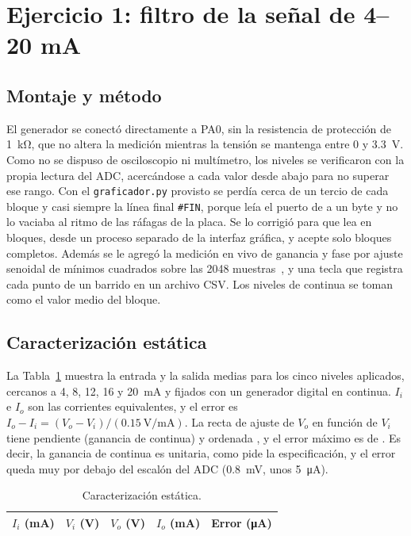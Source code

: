 \section{Ejercicio 1: filtro de la señal de 4--20 mA}

\subsection{Montaje y método}
El generador se conectó directamente a PA0, sin la resistencia de protección de \SI{1}{\kilo\ohm}, que no altera la medición mientras la tensión se mantenga entre 0 y \SI{3,3}{\volt}. Como no se dispuso de osciloscopio ni multímetro, los niveles se verificaron con la propia lectura del ADC, acercándose a cada valor desde abajo para no superar ese rango. Con el \texttt{graficador.py} provisto se perdía cerca de un tercio de cada bloque y casi siempre la línea final \texttt{\#FIN}, porque leía el puerto de a un byte y no lo vaciaba al ritmo de las ráfagas de la placa. Se lo corrigió para que lea en bloques, desde un proceso separado de la interfaz gráfica, y acepte solo bloques completos. Además se le agregó la medición en vivo de ganancia y fase por ajuste senoidal de mínimos cuadrados sobre las 2048 muestras~\cite{ieee1057}, y una tecla que registra cada punto de un barrido en un archivo CSV. Los niveles de continua se toman como el valor medio del bloque.

\subsection{Caracterización estática}
La Tabla~\ref{tab:estatica} muestra la entrada y la salida medias para los cinco niveles aplicados, cercanos a 4, 8, 12, 16 y \SI{20}{\milli\ampere} y fijados con un generador digital en continua. $I_i$ e $I_o$ son las corrientes equivalentes, y el error es $I_o - I_i = (V_o - V_i)/(\SI{0,15}{\volt\per\milli\ampere})$. La recta de ajuste de $V_o$ en función de $V_i$ tiene pendiente (ganancia de continua) \nm{\resGanDC} y ordenada \val{\resOrdDC}{\milli\volt}, y el error máximo es de \val{\resErrMax}{\micro\ampere}. Es decir, la ganancia de continua es unitaria, como pide la especificación, y el error queda muy por debajo del escalón del ADC (\SI{0,8}{\milli\volt}, unos \SI{5}{\micro\ampere}).

\begin{table}[!htb]
\centering
\caption{Caracterización estática.}
\label{tab:estatica}
\begin{tabular}{ccccc}
\toprule
$I_i$ (mA) & $V_i$ (V) & $V_o$ (V) & $I_o$ (mA) & Error (\si{\micro\ampere}) \\
\midrule

\end{tabular}
\end{table}

